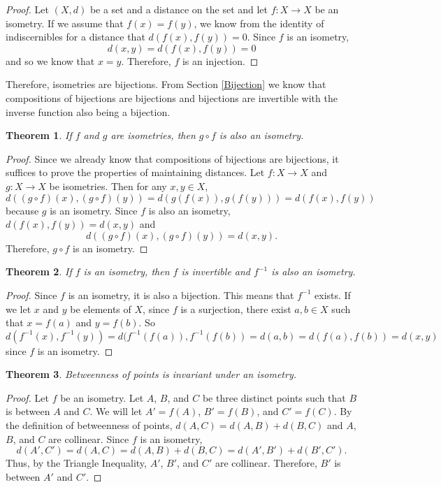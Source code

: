 \documentclass[
]{book}
\newtheorem{theorem}{Theorem}[chapter]
\theoremstyle{definition}
\theoremstyle{definition}
\theoremstyle{definition}
\theoremstyle{definition}
\theoremstyle{remark}
\begin{document}
\begin{proof}
Let \((X,d)\) be a set and a distance on the set and let \(f:X\rightarrow X\) be an isometry. If we assume that \(f(x)=f(y)\), we know from the identity of indiscernibles for a distance that \(d(f(x),f(y))=0\). Since \(f\) is an isometry, \[d(x,y)= d(f(x),f(y))=0\] and so we know that \(x=y\). Therefore, \(f\) is an injection.
\end{proof}

Therefore, isometries are bijections. From Section \ref{Bijection} we know that compositions of bijections are bijections and bijections are invertible with the inverse function also being a bijection.

\begin{theorem}
If \(f\) and \(g\) are isometries, then \(g\circ f\) is also an isometry.
\end{theorem}

\begin{proof}
Since we already know that compositions of bijections are bijections, it suffices to prove the properties of maintaining distances. Let \(f:X\rightarrow X\) and \(g:X\rightarrow X\) be isometries. Then for any \(x,y\in X\),
\[d\left((g\circ f)(x),(g\circ f)(y) \right) = d\left( g(f(x)),g(f(y))\right) = d\left(f(x),f(y)\right)\] because \(g\) is an isometry. Since \(f\) is also an isometry, \(d\left(f(x),f(y)\right) = d(x,y)\) and \[d\left((g\circ f)(x),(g\circ f)(y) \right) = d(x,y).\] Therefore, \(g\circ f\) is an isometry.
\end{proof}

\begin{theorem}
If \(f\) is an isometry, then \(f\) is invertible and \(f^{-1}\) is also an isometry.
\end{theorem}

\begin{proof}
Since \(f\) is an isometry, it is also a bijection. This means that \(f^{-1}\) exists. If we let \(x\) and \(y\) be elements of \(X\), since \(f\) is a surjection, there exist \(a,b\in X\) such that \(x=f(a)\) and \(y=f(b)\). So
\[d(f^{-1}(x),f^{-1}(y)) = d(f^{-1}(f(a)),f^{-1}(f(b))= d(a,b) = d(f(a),f(b))=d(x,y)\] since \(f\) is an isometry.
\end{proof}

\begin{theorem}
Betweenness of points is invariant under an isometry.
\end{theorem}

\begin{proof}
Let \(f\) be an isometry. Let \(A\), \(B\), and \(C\) be three distinct points such that \(B\) is between \(A\) and \(C\). We will let \(A' = f(A)\), \(B' = f(B)\), and \(C' = f(C)\). By the definition of betweenness of points, \(d(A,C) = d(A,B) + d(B,C)\) and \(A\), \(B\), and \(C\) are collinear. Since \(f\) is an isometry, \[d(A',C') = d(A,C)= d(A,B) + d(B,C) = d(A',B') +d(B',C').\] Thus, by the Triangle Inequality, \(A'\), \(B'\), and \(C'\) are collinear. Therefore, \(B'\) is between \(A'\) and \(C'\).
\end{proof}
\end{document}
